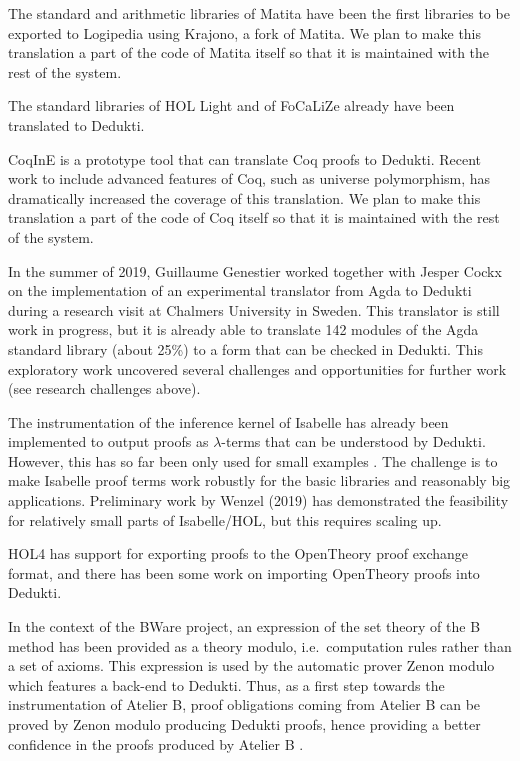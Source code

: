 \begin{compactitem}
\item The standard and arithmetic libraries of Matita have been the
  first libraries to be exported to Logipedia using Krajono, a fork of
  Matita. We plan to make this translation a part of the code of
  Matita itself so that it is maintained with the rest of the system.

\item The standard libraries of HOL Light and of FoCaLiZe already have been
  translated to Dedukti.

\item CoqInE is a prototype tool that can translate Coq proofs to
  Dedukti. Recent work to include advanced features of Coq, such as
  universe polymorphism, has dramatically increased the coverage of
  this translation. We plan to make this translation a part of the
  code of Coq itself so that it is maintained with the rest of the
  system.

\item In the summer of 2019, Guillaume Genestier worked together with
  Jesper Cockx on the implementation of an experimental translator
  from Agda to Dedukti during a research visit at Chalmers University
  in Sweden. This translator is still work in progress, but it is
  already able to translate 142 modules of the Agda standard library
  (about 25\%) to a form that can be checked in Dedukti. This
  exploratory work uncovered several challenges and opportunities for
  further work (see research challenges above).

\item The instrumentation of the inference kernel of Isabelle has already
  been implemented 
  to output proofs as $\lambda$-terms that can be understood by
  Dedukti. However, this has so far been only used for small examples
  \cite{Berghofer-Nipkow:2000:TPHOL}. The challenge is to make
  Isabelle proof terms work robustly for the basic libraries and
  reasonably big applications.  Preliminary work by Wenzel (2019) has
  demonstrated the feasibility for relatively small parts of
  Isabelle/HOL, but this requires scaling up.

\item HOL4 has support for exporting proofs to the OpenTheory proof
  exchange format, and there has been some work on importing
  OpenTheory proofs into Dedukti.

\item In the context of the BWare project, an expression of the set
  theory of the B method has been provided as a theory modulo, i.e.\ 
  computation rules rather than a set of axioms. This expression is used
  by the automatic prover Zenon modulo which features a back-end to
  Dedukti. Thus, as a first step towards the instrumentation of Atelier B,
  proof obligations coming from Atelier B can be proved by Zenon
  modulo producing Dedukti proofs, hence providing a better confidence
  in the proofs produced by Atelier B \cite{Bury18}.
\end{compactitem}

